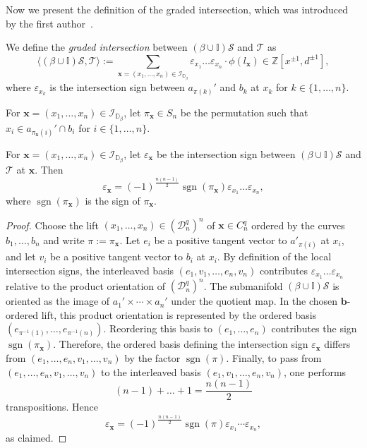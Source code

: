 \documentclass[11pt]{amsart}
\numberwithin{equation}{section}
\numberwithin{figure}{section}
\theoremstyle{definition}
\newcommand{\cD}{\mathcal{D}}
\newcommand{\cI}{\mathcal{I}}
\newcommand{\cs}{\mathscr{S}}
\newcommand{\ct}{\mathscr{T}}
\newcommand{\bD}{\mathbb{D}}
\newcommand{\bI}{\mathbb{I}}
\newcommand{\bZ}{\mathbb{Z}}
\DeclareMathOperator{\sgn}{\text{sgn}}
\newcommand{\bb}{\boldsymbol{b}}
\newcommand{\xs}{\boldsymbol{x}}
\begin{document}
Now we present the definition of the graded intersection, which was introduced by the first author~\cite[Definition~3.8]{Anghel2024AIF}. 

\begin{defn}\label{def:graded-intersection} 
We define the \emph{graded intersection} between $(\beta\cup \mathbb I)\cs$ and $\ct$ as 
\begin{equation}\label{int0}
\langle (\beta\cup \bI) \cs,\ct \rangle:= \sum_{\xs = (x_1,\dots,x_n)\in \cI_{\bD_\beta}} \varepsilon_{x_1} \dots \varepsilon_{x_n} \cdot \phi(l_{\xs}) \in \bZ[x^{\pm 1}, d^{\pm 1}],
\end{equation}
where $\varepsilon_{x_k}$ is the intersection sign between $a_{\pi(k)}'$ and $b_k$ at $x_k$ for $k \in \{1,\dots,n\}$.
\end{defn}

\begin{defn}
    For $\xs = (x_1,\dots,x_n) \in \cI_{\bD_\beta}$, let $\pi_{\xs} \in S_n$ be the permutation such that $x_i \in a_{\pi_{\xs}(i)}' \cap b_i$ for $i \in \{1,\dots,n\}$.
\end{defn}

\begin{lem}\label{lem:signs}
    For $\xs = (x_1,\dots,x_n) \in \cI_{\bD_\beta}$, let $\varepsilon_{\xs}$ be the intersection sign between $(\beta \cup \bI) \cs$ and $\ct$ at $\xs$. Then
    \[
    \varepsilon_{\xs} = (-1)^{\frac{n(n-1)}{2}} \sgn(\pi_{\xs}) \varepsilon_{x_1} \dots \varepsilon_{x_n},
    \]
    where $\sgn(\pi_{\xs})$ is the sign of $\pi_{\xs}$. 
\end{lem}

\begin{proof}
    Choose the lift $(x_1,\dots,x_n)\in (\cD_n^q)^n$ of $\xs \in C_n^q$ ordered by the curves $b_1,\dots,b_n$ and write $\pi := \pi_{\xs}$. Let $e_i$ be a positive tangent vector to $a'_{\pi(i)}$ at $x_i$, and let $v_i$ be a positive tangent vector to $b_i$ at $x_i$. By definition of the local intersection signs, the interleaved basis $(e_1,v_1,\dots,e_n,v_n)$ contributes $\varepsilon_{x_1}\dots \varepsilon_{x_n}$ relative to the product orientation of $(\cD_n^q)^n$. The submanifold $(\beta\cup\bI)\cs$ is oriented as the image of $a_1' \times \cdots \times a_n'$ under the quotient map. In the chosen $\bb$-ordered lift, this product orientation is represented by the ordered basis
    $(e_{\pi^{-1}(1)},\dots,e_{\pi^{-1}(n)})$. Reordering this basis to $(e_1,\dots,e_n)$ contributes the sign $\sgn(\pi_{\xs})$. Therefore, the ordered basis defining the intersection sign $\varepsilon_{\xs}$ differs from $(e_1,\dots,e_n,v_1,\dots,v_n)$ by the factor $\sgn(\pi)$. Finally, to pass from $(e_1,\dots,e_n,v_1,\dots,v_n)$ to the interleaved basis
    $(e_1,v_1,\dots,e_n,v_n)$, one performs 
    \[
    (n-1)+\dots+1=\frac{n(n-1)}{2}
    \]
    transpositions. Hence
    \[
    \varepsilon_{\xs} = (-1)^{\frac{n(n-1)}{2}} \sgn(\pi) \varepsilon_{x_1}\cdots \varepsilon_{x_n},
    \]
    as claimed.
\end{proof}
\end{document}
